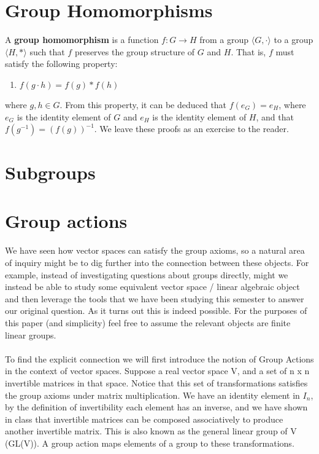 \documentclass{article}
\begin{document}
\section{Group Homomorphisms} 

A \textbf{group homomorphism} is a function $f:G\rightarrow H$ from a group 
$\langle G, \cdot\rangle$ to a group $\langle H, *\rangle$ such that 
$f$ preserves the group structure of $G$ and $H$. That is, $f$ must satisfy the following
property:
\begin{enumerate}
    \item $f(g\cdot h) = f(g) * f(h)$
\end{enumerate}
where $g,h\in G$.
From this property, it can be deduced that $f(e_G) = e_H$, where $e_G$ is the
identity element of $G$ and $e_H$ is the identity element of $H$, and that 
$f(g^{-1}) = (f(g))^{-1}$. We leave these proofs as an exercise to the reader.



\section{Subgroups}

\section{Group actions}
\paragraph*{} We have seen how vector spaces can satisfy the group axioms, so a 
natural area of inquiry might be to dig further into the connection between these
 objects. For example, instead of investigating questions about groups directly, 
 might we instead be able to study some equivalent vector space / linear algebraic 
 object and then leverage the tools that we have been studying this semester to
answer our original question. As it turns out this is indeed possible. For the 
purposes of this paper (and simplicity) feel free to assume the relevant objects 
are finite linear groups. 
\paragraph*{} To find the explicit connection we will first introduce the notion
 of Group Actions in the context of vector spaces. Suppose a real vector space V,
  and a set of n x n invertible matrices in that space. Notice that this set of
  transformations satisfies the group axioms under matrix multiplication. We have
 an identity element in $I_n$, by the definition of invertibility each element
  has an inverse, and we have shown in class that invertible matrices can be 
  composed associatively to produce another invertible matrix. This is also known 
  as the general linear group of V (GL(V)). A group action maps elements of a 
  group to these transformations.  
\end{document}
